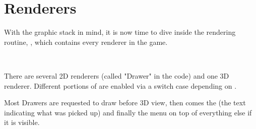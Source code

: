 \section{Renderers}
With the graphic stack in mind, it is now time to dive inside the rendering routine, , which contains every renderer in the game.\\
\par
{}\\
\par
 There are several 2D renderers (called "Drawer" in the code) and one 3D renderer. Different portions of  are enabled via a switch case depending on .\\
 \par
  Most Drawers are requested to draw before 3D view, then comes the  (the text indicating what was picked up) and finally the menu on top of everything else if it is visible.
